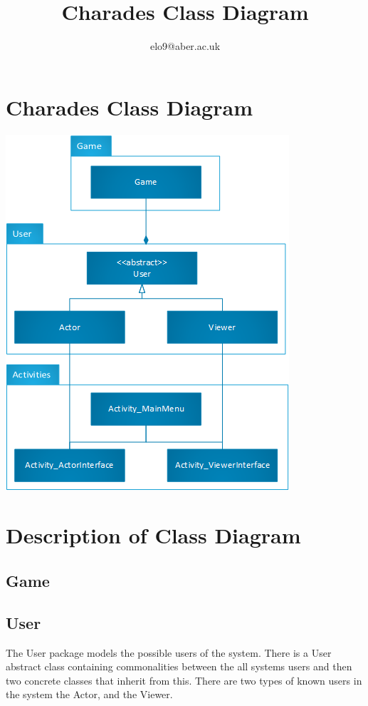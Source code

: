 \documentclass{article}
\title{Charades Class Diagram}
\author{elo9@aber.ac.uk}
\begin{document}
\maketitle
\tableofcontents

\newpage

\section{Charades Class Diagram}
\includegraphics[width=\textwidth]{CharadesClassImage}

\newpage


\section{Description of Class Diagram}
\subsection{Game}

\subsection{User}
The User package models the possible users of the system. There is a User abstract class containing commonalities between the all systems users and then two concrete classes that inherit from this. There are two types of known users in the system the Actor, and the Viewer. 
\end{document}
